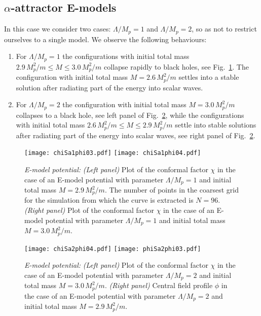 \documentclass[11pt,a4paper]{article}
\begin{document}
\subsection{$\alpha$-attractor E-models}

In this case we consider two cases: $\Lambda/M_p = 1$ and $\Lambda/M_p = 2$, so as not to restrict ourselves to a single model. We observe the following behaviours:	\\
\begin{enumerate}
\item For $\Lambda/M_p = 1$ the configurations with initial total mass $2.9 \, M_p^2/m \leq M \leq 3.0 \, M_p^2/m$ collapse rapidly to black holes, see Fig.~\ref{fig:chiSa1phi0304}. The configuration with initial total mass $M = 2.6 \, M_p^2/m$ settles into a stable solution after radiating part of the energy into scalar waves.
\item For $\Lambda/M_p = 2$ the configuration with initial total mass $M = 3.0 \, M_p^2/m$ collapses to a black hole, see left panel of Fig.~\ref{fig:chiSa2phi0304}, while the configurations with initial total mass $2.6 \, M_p^2/m \leq M \leq 2.9 \, M_p^2/m$ settle into stable solutions after radiating part of the energy into scalar waves, see right panel of Fig.~\ref{fig:chiSa2phi0304}.
\end{enumerate}

\begin{figure}[h!]
    \centering
    \texttt{[image: chiSa1phi03.pdf]}
    \texttt{[image: chiSa1phi04.pdf]}
    \caption{{\it E-model potential: } \textit{(Left panel)} Plot of the conformal factor $\chi$ in the case of an E-model potential with parameter $\Lambda/M_p = 1$ and initial total mass $M = 2.9 \, M_p^2/m$. The number of points in the coarsest grid for the simulation from which the curve is extracted is $N=96$. \textit{(Right panel)} Plot of the conformal factor $\chi$ in the case of an E-model potential with parameter $\Lambda/M_p = 1$ and initial total mass $M = 3.0 \, M_p^2/m$.}
\label{fig:chiSa1phi0304}
\end{figure}


\begin{figure}[h!]
    \centering
    \texttt{[image: chiSa2phi04.pdf]}
    \texttt{[image: phiSa2phi03.pdf]}
    \caption{{\it E-model potential: }\textit{(Left panel)} Plot of the conformal factor $\chi$ in the case of an E-model potential with parameter $\Lambda/M_p = 2$ and initial total mass $M = 3.0 \, M_p^2/m$. \textit{(Right panel)} Central field profile $\phi$ in the case of an E-model potential with parameter $\Lambda/M_p = 2$ and initial total mass $M = 2.9 \, M_p^2/m$.}
\label{fig:chiSa2phi0304}
\end{figure}
\end{document}
